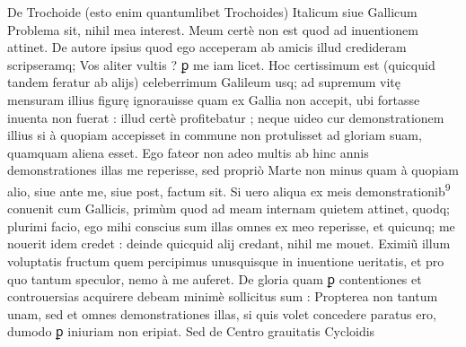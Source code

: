\documentclass[11pt,a4paper]{article}
\begin{document}
De Trochoide (esto enim quantumlibet Trochoides)  Italicum siue Gallicum Problema sit, nihil mea interest. Meum certè non est quod ad inuentionem attinet. De autore ipsius quod ego acceperam ab amicis illud credideram scripseramq; Vos aliter vultis ? ꝑ me iam licet. Hoc certissimum est (quicquid tandem feratur ab alijs) celeberrimum Galileum usq; ad supremum vitę  mensuram illius figurę ignorauisse quam ex Gallia non accepit, ubi fortasse inuenta non fuerat : illud certè profitebatur ; neque uideo cur demonstrationem illius si à quopiam accepisset in commune non protulisset ad gloriam suam, quamquam aliena esset. Ego fateor non adeo multis ab hinc annis demonstrationes illas me reperisse, sed propriò Marte non minus quam à quopiam alio, siue ante me, siue post, factum  sit. Si uero aliqua ex meis demonstrationib\textsuperscript{9} conuenit cum Gallicis, primùm quod ad meam internam quietem attinet, quodq; plurimi facio, ego mihi conscius sum illas omnes ex meo reperisse, \struck{\&} et quicunq; me nouerit idem credet : deinde quicquid alij credant, nihil me mouet. Eximiũ illum voluptatis fructum quem percipimus unusquisque in inuentione ueritatis, et pro quo tantum speculor, nemo à me auferet. De gloria quam ꝑ contentiones et controuersias acquirere debeam minimè sollicitus sum : Propterea non tantum unam, sed et omnes demonstrationes illas, si quis volet concedere paratus ero, dumodo ꝑ iniuriam non eripiat. Sed de Centro grauitatis Cycloidis

\end{document}
